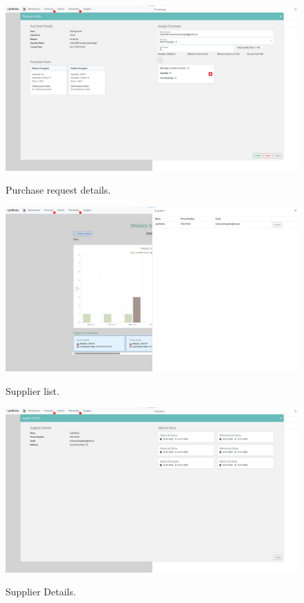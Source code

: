  


\begin{figure}[htbp]
  \caption{Purchase request details.}
  \centering
  \includegraphics[width=\textwidth]{figs/Implementation/workshopmanager/purchaseDetails}
  \label{fig:workshopmanagerPurchaseDetails}
\end{figure}


\begin{figure}[htbp]
  \caption{Supplier list.}
  \centering
  \includegraphics[width=\textwidth]{figs/Implementation/workshopmanager/supplierList}
  \label{fig:workshopmanagerSupplierList}
\end{figure}

\begin{figure}[htbp]
  \caption{Supplier Details.}
  \centering
  \includegraphics[width=\textwidth]{figs/Implementation/workshopmanager/supplierDetails}
  \label{fig:workshopmanagerupplierDetails}
\end{figure}



